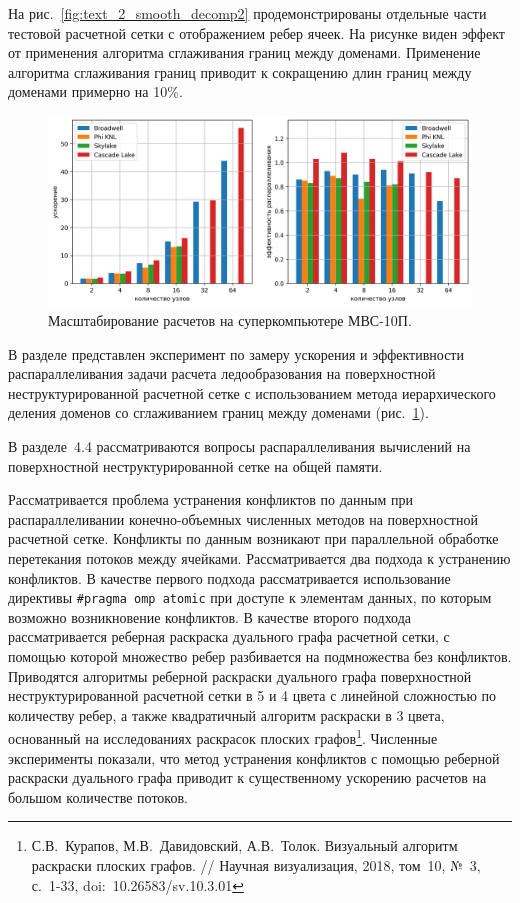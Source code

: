 \documentclass[a4paper,14pt]{extarticle}                     %
\theoremstyle{plain}                                         %
\begin{document}
На рис.~\ref{fig:text_2_smooth_decomp2} продемонстрированы отдельные части тестовой расчетной сетки с отображением ребер ячеек.
На рисунке виден эффект от применения алгоритма сглаживания границ между доменами.
Применение алгоритма сглаживания границ приводит к сокращению длин границ между доменами примерно на 10\%.

\begin{figure}[!ht]
\centering
\includegraphics[width=1.0\textwidth]{pics/text_2_scaling/2in1.png}
\singlespacing
\caption{Масштабирование расчетов на суперкомпьютере МВС-10П.}
\label{fig:text_2_scaling_speedup_eff}
\end{figure}

В разделе представлен эксперимент по замеру ускорения и эффективности распараллеливания задачи расчета ледообразования на поверхностной неструктурированной расчетной сетке с использованием метода иерархического деления доменов со сглаживанием границ между доменами (рис.~\ref{fig:text_2_scaling_speedup_eff}).


В разделе~4.4 рассматриваются вопросы распараллеливания вычислений на поверхностной неструктурированной сетке на общей памяти.

Рассматривается проблема устранения конфликтов по данным при распараллеливании конечно-объемных численных методов на поверхностной расчетной сетке.
Конфликты по данным возникают при параллельной обработке перетекания потоков между ячейками.
Рассматривается два подхода к устранению конфликтов.
В качестве первого подхода рассматривается использование директивы \texttt{\#pragma omp atomic} при доступе к элементам данных, по которым возможно возникновение конфликтов.
В качестве второго подхода рассматривается реберная раскраска дуального графа расчетной сетки, с помощью которой множество ребер разбивается на подмножества без конфликтов.
Приводятся алгоритмы реберной раскраски дуального графа поверхностной неструктурированной расчетной сетки в 5 и 4 цвета с линейной сложностью по количеству ребер, а также квадратичный алгоритм раскраски в 3 цвета, основанный на исследованиях раскрасок плоских графов\footnote[4]{С.В.~Курапов, М.В.~Давидовский, А.В.~Толок. Визуальный алгоритм раскраски плоских графов. // Научная визуализация, 2018, том~10, №~3, с.~1-33, doi:~10.26583/sv.10.3.01}.
Численные эксперименты показали, что метод устранения конфликтов с помощью реберной раскраски дуального графа приводит к существенному ускорению расчетов на большом количестве потоков.
\end{document}
